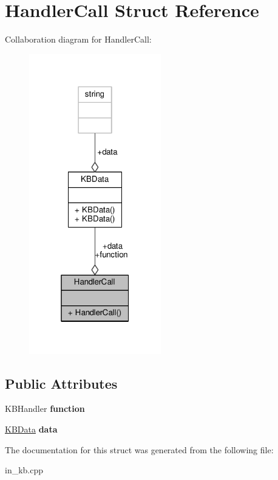 \hypertarget{structHandlerCall}{}\section{Handler\+Call Struct Reference}
\label{structHandlerCall}


Collaboration diagram for Handler\+Call\+:
\nopagebreak
\begin{figure}[H]
\begin{center}
\leavevmode
\includegraphics[width=163pt]{de/d62/structHandlerCall__coll__graph}
\end{center}
\end{figure}
\subsection*{Public Attributes}
\begin{DoxyCompactItemize}
\item 
K\+B\+Handler {\bfseries function}\hypertarget{structHandlerCall_a4d4dcaeb58f8db33019ffda146b70521}{}\label{structHandlerCall_a4d4dcaeb58f8db33019ffda146b70521}

\item 
\hyperlink{classKBData}{K\+B\+Data} {\bfseries data}\hypertarget{structHandlerCall_a470ca9e5a850ea626a133a4be6cff442}{}\label{structHandlerCall_a470ca9e5a850ea626a133a4be6cff442}

\end{DoxyCompactItemize}


The documentation for this struct was generated from the following file\+:\begin{DoxyCompactItemize}
\item 
in\+\_\+kb.\+cpp\end{DoxyCompactItemize}

